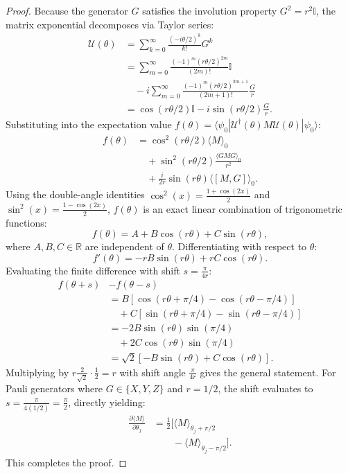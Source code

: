 \documentclass[pdflatex,sn-mathphys-num]{sn-jnl}%
\theoremstyle{thmstyleone}%
\theoremstyle{thmstyletwo}%
\theoremstyle{thmstylethree}%
\begin{document}
\begin{proof}
Because the generator $G$ satisfies the involution property $G^2 = r^2 \mathbb{I}$, the matrix exponential decomposes via Taylor series:
\begin{align}
\mathcal{U}(\theta) &= \sum_{k=0}^{\infty} \frac{(-i \theta / 2)^k}{k!} G^k \nonumber \\
&= \sum_{m=0}^{\infty} \frac{(-1)^m (r\theta/2)^{2m}}{(2m)!} \mathbb{I} \nonumber \\
&\quad - i \sum_{m=0}^{\infty} \frac{(-1)^m (r\theta/2)^{2m+1}}{(2m+1)!} \frac{G}{r} \nonumber \\
&= \cos(r\theta/2) \mathbb{I} - i \sin(r\theta/2) \frac{G}{r}.
\end{align}
Substituting into the expectation value $f(\theta) = \langle \psi_0 | \mathcal{U}^\dagger(\theta) M \mathcal{U}(\theta) | \psi_0 \rangle$:
\begin{align}
f(\theta) &= \cos^2(r\theta / 2) \langle M \rangle_0 \nonumber \\
&\quad + \sin^2(r\theta / 2) \frac{\langle G M G \rangle_0}{r^2} \nonumber \\
&\quad + \frac{i}{2r} \sin(r\theta) \langle [M, G] \rangle_0.
\end{align}
Using the double-angle identities $\cos^2(x) = \frac{1+\cos(2x)}{2}$ and $\sin^2(x) = \frac{1-\cos(2x)}{2}$, $f(\theta)$ is an exact linear combination of trigonometric functions:
\begin{equation}
f(\theta) = A + B \cos(r\theta) + C \sin(r\theta),
\end{equation}
where $A, B, C \in \mathbb{R}$ are independent of $\theta$. Differentiating with respect to $\theta$:
\begin{equation}
f'(\theta) = -r B \sin(r\theta) + r C \cos(r\theta).
\label{eq:trig_derivative}
\end{equation}
Evaluating the finite difference with shift $s = \frac{\pi}{4r}$:
\begin{align}
f(\theta + s) &- f(\theta - s) \nonumber \\
&= B \left[\cos(r\theta + \pi/4) - \cos(r\theta - \pi/4)\right] \nonumber \\
&\quad + C \left[\sin(r\theta + \pi/4) - \sin(r\theta - \pi/4)\right] \nonumber \\
&= -2 B \sin(r\theta) \sin(\pi/4) \nonumber \\
&\quad + 2 C \cos(r\theta) \sin(\pi/4) \nonumber \\
&= \sqrt{2} [-B \sin(r\theta) + C \cos(r\theta)].
\end{align}
Multiplying by $r \frac{2}{\sqrt{2}} \cdot \frac{1}{2} = r$ with shift angle $\frac{\pi}{4r}$ gives the general statement. For Pauli generators where $G \in \{X, Y, Z\}$ and $r = 1/2$, the shift evaluates to $s = \frac{\pi}{4(1/2)} = \frac{\pi}{2}$, directly yielding:
\begin{align}
\frac{\partial \langle M \rangle}{\partial \theta_j} &= \frac{1}{2} \Big[ \langle M \rangle_{\theta_j + \pi/2} \nonumber \\
&\qquad - \langle M \rangle_{\theta_j - \pi/2} \Big].
\end{align}
This completes the proof.
\end{proof}
\end{document}
